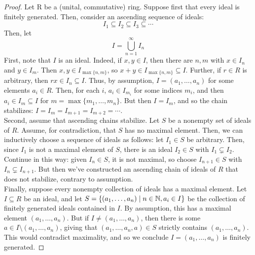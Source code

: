 \begin{proof}
	Let R be a (unital, commutative) ring. Suppose first that every ideal is finitely generated. Then, consider an ascending sequence of ideals:
	\[ I_1 \subseteq I_2 \subseteq I_3 \subseteq \cdots \]
	Then, let
	\[ I = \bigcup_{n=1}^\infty I_n \]
	First, note that $I$ is an ideal. Indeed, if $x,y \in I$, then there are $n,m$ with $x \in I_n$ and $y \in I_m$. Then $x,y \in I_{\max\{n,m\}}$, so $x+y \in I_{\max\{n,m\}} \subseteq I$. Further, if $r \in R$ is arbitrary, then $rx \in I_n \subseteq I$. Thus, by assumption, $I = (a_1,\ldots,a_n)$ for some elements $a_i \in R$. Then, for each $i$, $a_i \in I_{m_i}$ for some indices $m_i$, and then $a_i \in I_m \subseteq I$ for $m = \max\{m_1,\ldots,m_n\}$. But then $I = I_m$, and so the chain stabilizes: $I = I_m = I_{m+1} = I_{m+2} = \cdots$. \\
	
	Second, assume that ascending chains stabilize. Let $S$ be a nonempty set of ideals of $R$. Assume, for contradiction, that $S$ has no maximal element. Then, we can inductively choose a sequence of ideals as follows: let $I_1 \in S$ be arbitrary. Then, since $I_1$ is not a maximal element of $S$, there is an ideal $I_2 \in S$ with $I_1 \subsetneq I_2$. Continue in this way: given $I_n \in S$, it is not maximal, so choose $I_{n+1} \in S$ with $I_n \subsetneq I_{n+1}$. But then we've constructed an ascending chain of ideals of $R$ that does not stabilize, contrary to assumption. \\
	
	Finally, suppose every nonempty collection of ideals has a maximal element. Let $I \subseteq R$ be an ideal, and let $S = \{ (a_1,\ldots,a_n) \mid n \in \mathbb{N}, a_i \in I \}$ be the collection of finitely generated ideals contained in $I$. By assumption, this has a maximal element $(a_1,\ldots,a_n)$. But if $I \neq (a_1,\ldots,a_n)$, then there is some $a \in I \setminus (a_1,\ldots,a_n)$, giving that $(a_1,\ldots,a_n,a) \in S$ strictly contains $(a_1,\ldots,a_n)$. This would contradict maximality, and so we conclude $I = (a_1,\ldots,a_n)$ is finitely generated.
\end{proof}
